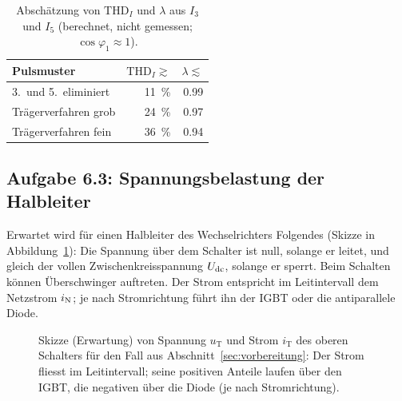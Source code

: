 \begin{table}[htbp]
  \centering
  \caption{Abschätzung von $\mathrm{THD}_I$ und $\lambda$ aus $I_3$ und $I_5$ (berechnet, nicht gemessen; $\cos\varphi_1\approx1$).}
  \label{tab:622}
  \begin{tabular}{@{}lrr@{}}
    \toprule
    Pulsmuster & $\mathrm{THD}_I\gtrsim$ & $\lambda\lesssim$ \\
    \midrule
    3.\ und 5.\ eliminiert & \SI{11}{\percent} & 0.99 \\
    Trägerverfahren grob & \SI{24}{\percent} & 0.97 \\
    Trägerverfahren fein & \SI{36}{\percent} & 0.94 \\
    \bottomrule
  \end{tabular}
\end{table}

\subsection{Aufgabe 6.3: Spannungsbelastung der Halbleiter}
\label{sec:messung63}

Erwartet wird für einen Halbleiter des Wechselrichters Folgendes (Skizze in Abbildung~\ref{fig:halbleiter_skizze}): Die Spannung über dem Schalter ist null, solange er leitet, und gleich der vollen Zwischenkreisspannung $U_{\mathrm{dc}}$, solange er sperrt. Beim Schalten können Überschwinger auftreten. Der Strom entspricht im Leitintervall dem Netzstrom $i_{\mathrm{N}}$; je nach Stromrichtung führt ihn der IGBT oder die antiparallele Diode.

\begin{figure}[htbp]
  \centering

  \caption{Skizze (Erwartung) von Spannung $u_{\mathrm T}$ und Strom $i_{\mathrm T}$ des oberen Schalters für den Fall aus Abschnitt~\ref{sec:vorbereitung}: Der Strom fliesst im Leitintervall; seine positiven Anteile laufen über den IGBT, die negativen über die Diode (je nach Stromrichtung).}
  \label{fig:halbleiter_skizze}
\end{figure}


